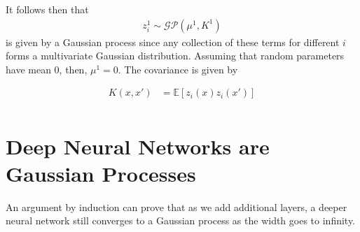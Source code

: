 \documentclass[book.tex]{subfiles}
\begin{document}
It follows then that 
\begin{align}
z^1_i \sim \mathcal{GP}(\mu^1, K^1)
\end{align} 
is given by a Gaussian process since any collection of these terms for different $i$ forms a multivariate Gaussian distribution. Assuming that random parameters have mean $0$, then, $\mu^1 = 0$. The covariance is given by

\begin{align}
K(x, x') &= \mathbb{E}[z_i(x)z_i(x')] \\
\end{align}

\section{Deep Neural Networks are Gaussian Processes}

An argument by induction can prove that as we add additional layers, a deeper neural network still converges to a Gaussian process as the width goes to infinity.
\end{document}
